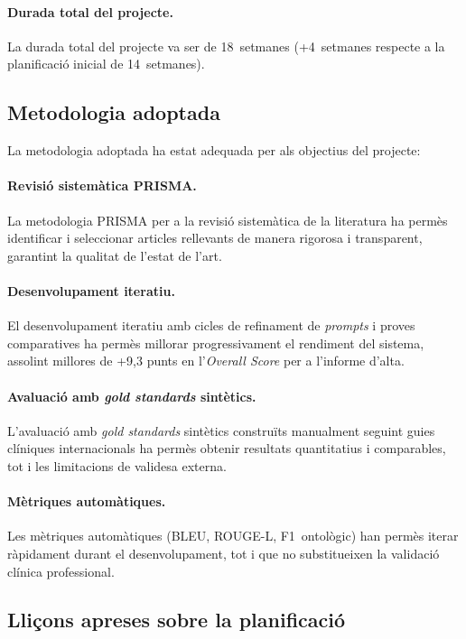 \documentclass[CAT]{TFUOC}%
\begin{document}
\paragraph{Durada total del projecte.}
La durada total del projecte va ser de 18~setmanes (+4~setmanes respecte a la planificació inicial de 14~setmanes).

\subsection{Metodologia adoptada}

La metodologia adoptada ha estat adequada per als objectius del projecte:

\paragraph{Revisió sistemàtica PRISMA.}
La metodologia PRISMA per a la revisió sistemàtica de la literatura ha permès identificar i seleccionar articles rellevants de manera rigorosa i transparent, garantint la qualitat de l'estat de l'art.

\paragraph{Desenvolupament iteratiu.}
El desenvolupament iteratiu amb cicles de refinament de \textit{prompts} i proves comparatives ha permès millorar progressivament el rendiment del sistema, assolint millores de +9,3 punts en l'\textit{Overall Score} per a l'informe d'alta.

\paragraph{Avaluació amb \textit{gold standards} sintètics.}
L'avaluació amb \textit{gold standards} sintètics construïts manualment seguint guies clíniques internacionals ha permès obtenir resultats quantitatius i comparables, tot i les limitacions de validesa externa.

\paragraph{Mètriques automàtiques.}
Les mètriques automàtiques (BLEU, ROUGE-L, F1~ontològic) han permès iterar ràpidament durant el desenvolupament, tot i que no substitueixen la validació clínica professional.

\subsection{Lliçons apreses sobre la planificació}
\end{document}
